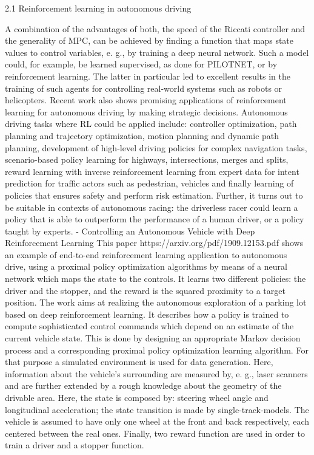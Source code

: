 2.1 Reinforcement learning in autonomous driving

A combination of the advantages of both, the speed of the Riccati controller and the generality of MPC, can be achieved by finding a function that maps state values to
control variables, e. g., by training a deep neural network. Such a model could, for example, be learned supervised, as done for PILOTNET, or by reinforcement learning. The latter in particular led to excellent results in the training of such agents for controlling real-world systems such as robots or helicopters.
Recent work also shows promising applications of reinforcement learning for autonomous driving by making strategic decisions. 
Autonomous driving tasks where RL could be applied include: controller optimization, path planning and trajectory optimization, motion planning and dynamic path planning, development of high-level driving policies for complex navigation tasks, scenario-based policy learning for highways, intersections, merges and splits, reward learning with inverse reinforcement learning from expert data for intent prediction for traffic actors such as pedestrian, vehicles and finally learning of policies that ensures safety and perform risk estimation. Further, it turns out to be suitable in contexts of autonomous racing: the driverless racer could learn a policy that is able to outperform the performance of a human driver, or a policy taught by experts.
- Controlling an Autonomous Vehicle with Deep Reinforcement Learning
This paper https://arxiv.org/pdf/1909.12153.pdf shows an example of end-to-end reinforcement learning application to autonomous drive, using a proximal policy optimization algorithms by means of a neural network which maps the state to the controls. It learns two different policies: the driver and the stopper, and the reward is the squared proximity to a target position. The work aims at realizing the autonomous exploration of a parking lot based on deep reinforcement learning. It describes how a policy is trained to compute sophisticated control commands which depend on an estimate of the current vehicle state. This is done by designing an appropriate Markov decision process and a corresponding proximal policy optimization learning algorithm. For that purpose a simulated environment is used for data generation. Here, information about the vehicle's surrounding are measured by, e. g., laser scanners and are further extended by a rough knowledge about the geometry of the drivable area.
Here, the state is composed by: steering wheel angle and longitudinal acceleration; the state transition is made by single-track-models. The vehicle is assumed to have only one wheel at the front and back respectively, each centered between the real ones. Finally, two reward function are used in order to train a driver and a stopper function.


